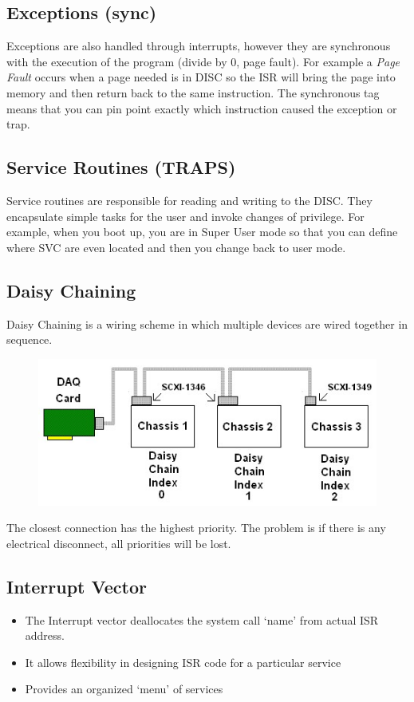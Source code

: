 \documentclass{hw}
\begin{document}
\subsection{Exceptions (sync)}
Exceptions are also handled through interrupts, however they are synchronous with
the execution of the program (divide by 0, page fault). For example a 
\emph{Page Fault} occurs when a page needed is in DISC so the ISR will bring the 
page into memory and then return back to the same instruction. The synchronous 
tag means that you can pin point exactly which instruction caused the exception
or trap.

\subsection{Service Routines (TRAPS)}
Service routines are responsible for reading and writing to the DISC\@. They 
encapsulate simple tasks for the user and invoke changes of privilege. For example,
when you boot up, you are in Super User mode so that you can define where SVC are
even located and then you change back to user mode.

\subsection{Daisy Chaining}
Daisy Chaining is a wiring scheme in which multiple devices are wired together 
in sequence. 
\begin{figure}[H]
  \centering
  \includegraphics[scale=.8]{img/dchain}
\end{figure}

The closest connection has the highest priority. The problem is if there is any
electrical disconnect, all priorities will be lost.

\subsection{Interrupt Vector}
\begin{itemize}
  \item The Interrupt vector deallocates the system call `name' from actual ISR
    address.
  \item It allows flexibility in designing ISR code for a particular service
  \item Provides an organized `menu' of services
\end{itemize}
\end{document}

